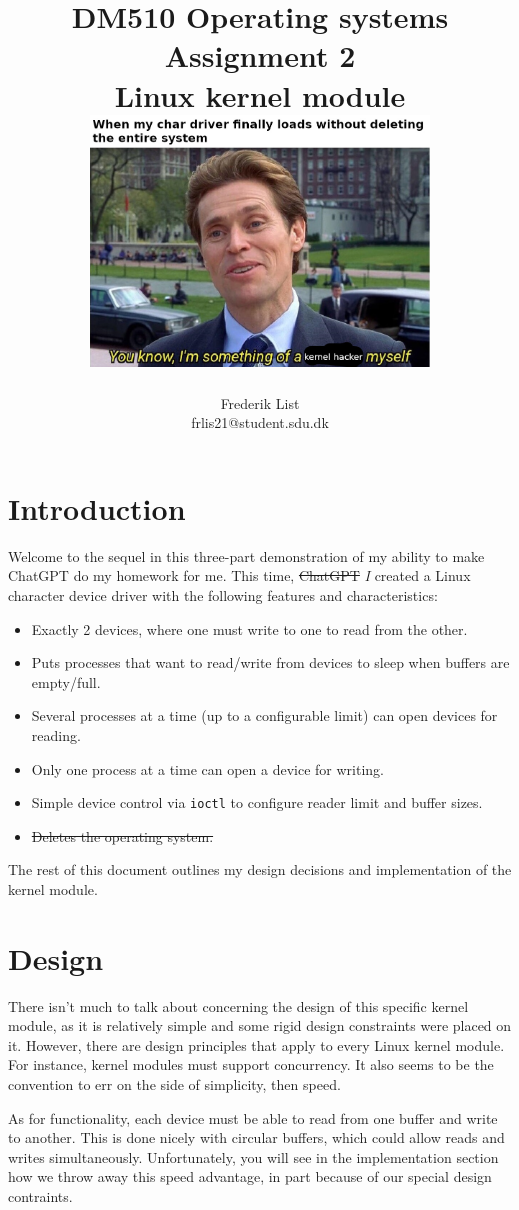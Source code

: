 \documentclass{report}
\title{
	DM510 Operating systems \\
	Assignment 2 \\
	\normalsize Linux kernel module \\
	\vspace{1cm}
	\includegraphics[width=9cm, frame]{kernel_hacker}
}
\author{
	Frederik List \\
	\small frlis21@student.sdu.dk \\
}
\begin{document}
\maketitle

\section*{Introduction}

Welcome to the sequel in this three-part demonstration of my ability to make ChatGPT do my homework for me.
This time, \sout{ChatGPT} \emph{I} created a Linux character device driver with the following features and characteristics:

\begin{itemize}
	\item Exactly 2 devices, where one must write to one to read from the other.
	\item Puts processes that want to read/write from devices to sleep when buffers are empty/full.
	\item Several processes at a time (up to a configurable limit) can open devices for reading.
	\item Only one process at a time can open a device for writing.
	\item Simple device control via \texttt{ioctl} to configure reader limit and buffer sizes.
	\item \sout{Deletes the operating system.}
\end{itemize}

The rest of this document outlines my design decisions and implementation of the kernel module.

\section*{Design}

There isn't much to talk about concerning the design of this specific kernel module,
as it is relatively simple and some rigid design constraints were placed on it.
However, there are design principles that apply to every Linux kernel module.
For instance, kernel modules must support concurrency.
It also seems to be the convention to err on the side of simplicity, then speed.

As for functionality, each device must be able to read from one buffer and write to another.
This is done nicely with circular buffers, which could allow reads and writes simultaneously.
Unfortunately, you will see in the implementation section how we throw away this speed advantage,
in part because of our special design contraints.
\end{document}
